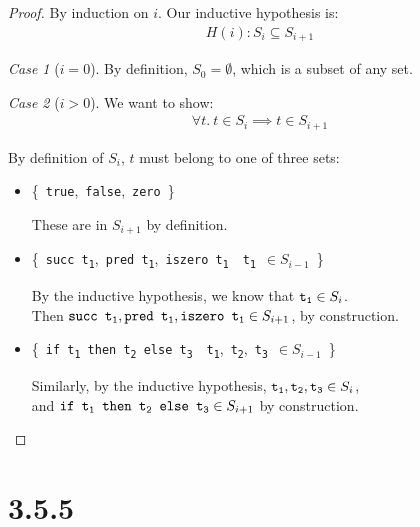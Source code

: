 \documentclass{article}
\newcommand{\set}[1]{\{\ #1\ \}}
\newcommand{\comp}[2]{\set{#1\ \mid\ #2}}
\newcommand{\term}[1]{\texttt{t\textsubscript{#1}}}
\newcommand{\ms}[1]{\texttt{#1}}
\theoremstyle{remark}
\newtheorem*{case}{Case}
\begin{document}
    \begin{proof}
        By induction on $i$. Our inductive hypothesis is:
        \begin{align*}
            H(i): S_i \subseteq S_{i + 1}
        \end{align*}

        \begin{case}[$i = 0$]
            By definition, $S_0 = \emptyset$, which is a subset of any set.
        \end{case}

        \begin{case}[$i > 0$]
            We want to show:
            \begin{align*}
                \forall t.\ t \in S_i \implies t \in S_{i + 1}
            \end{align*}

            By definition of $S_i$, $t$ must belong to one of three sets:

            \begin{itemize}
                \item{\set{\ms{true},\ \ms{false},\ \ms{zero}}}

                These are in $S_{i + 1}$ by definition.

                \item{\comp{\ms{succ \term{1}},\ \ms{pred \term{1}},\ \ms{iszero \term{1}}}{\term{1}\ $\in S_{i - 1}$}}

                By the inductive hypothesis, we know that $\term{1} \in S_i$.\\
                Then $\ms{succ \term{1}}, \ms{pred \term{1}}, \ms{iszero \term{1}} \in S_{i + 1}$, by construction.

                \item{\comp{\ms{if \term{1} then \term{2} else \term{3}}}{\term{1},\ \term{2},\ \term{3}\ $\in S_{i - 1}$}}

                Similarly, by the inductive hypothesis, $\term{1}, \term{2}, \term{3} \in S_i$,\\
                and $\ms{if \term{1} then \term{2} else \term{3}} \in S_{i + 1}$ by construction.
            \end{itemize}
        \end{case}
    \end{proof}

\section{3.5.5}
\end{document}
